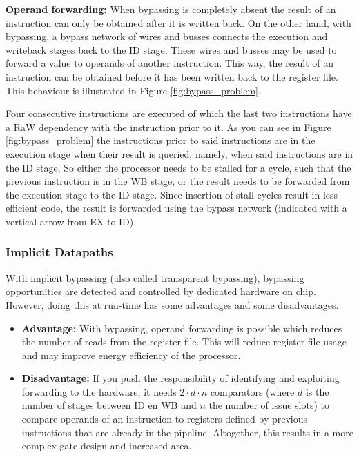 \textbf{Operand forwarding:} When bypassing is completely absent the result of an instruction can only be obtained after it is written back. On the other hand, with bypassing, a bypass network of wires and busses connects the execution and writeback stages back to the ID stage. These wires and busses may be used to forward a value to operands of another instruction. This way, the result of an instruction can be obtained before it has been written back to the register file. This behaviour is illustrated in Figure \ref{fig:bypass_problem}.

Four consecutive instructions are executed of which the last two instructions have a RaW dependency with the instruction prior to it. As you can see in Figure \ref{fig:bypass_problem} the instructions prior to said instructions are in the execution stage when their result is queried, namely, when said instructions are in the ID stage. So either the processor needs to be stalled for a cycle, such that the previous instruction is in the WB stage, or the result needs to be forwarded from the execution stage to the ID stage. Since insertion of stall cycles result in less efficient code, the result is forwarded using the bypass network (indicated with a vertical arrow from EX to ID).

\subsubsection{Implicit Datapaths}
With implicit bypassing (also called transparent bypassing), bypassing opportunities are detected and controlled by dedicated hardware on chip. However, doing this at run-time has some advantages and some disadvantages.
\begin{itemize}
  \item\textbf{Advantage:} 
    With bypassing, operand forwarding is possible which reduces the number of reads from the register file. This will reduce register file usage and may improve energy efficiency of the processor.
  \item\textbf{Disadvantage:} 
    If you push the responsibility of identifying and exploiting forwarding to the hardware, it needs $2\cdot d\cdot n$ comparators (where $d$ is the number of stages between ID en WB and $n$ the number of issue slots) to compare operands of an instruction to registers defined by previous instructions that are already in the pipeline. Altogether, this results in a more complex gate design and increased area.
\end{itemize}

